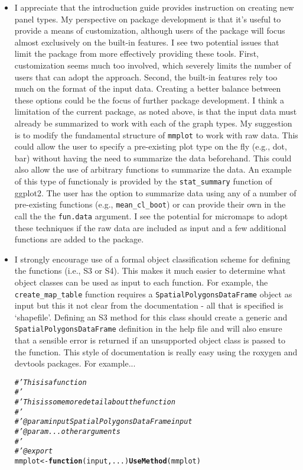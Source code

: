 \documentclass[letterpaper,12pt]{article}\usepackage[]{graphicx}\usepackage[]{color}
\makeatletter
\newcommand{\hlcom}[1]{\textcolor[rgb]{0.678,0.584,0.686}{\textit{#1}}}%
\newcommand{\hlstd}[1]{\textcolor[rgb]{0.345,0.345,0.345}{#1}}%
\newcommand{\hlkwa}[1]{\textcolor[rgb]{0.161,0.373,0.58}{\textbf{#1}}}%
\newcommand{\hlkwb}[1]{\textcolor[rgb]{0.69,0.353,0.396}{#1}}%
\newcommand{\hlkwc}[1]{\textcolor[rgb]{0.333,0.667,0.333}{#1}}%
\newcommand{\hlkwd}[1]{\textcolor[rgb]{0.737,0.353,0.396}{\textbf{#1}}}%
\newenvironment{kframe}{%
 \def\at@end@of@kframe{}%
 \ifinner\ifhmode%
  \def\at@end@of@kframe{\end{minipage}}%
  \begin{minipage}{\columnwidth}%
 \fi\fi%
 \def\FrameCommand##1{\hskip\@totalleftmargin \hskip-\fboxsep
 \colorbox{shadecolor}{##1}\hskip-\fboxsep
     \hskip-\linewidth \hskip-\@totalleftmargin \hskip\columnwidth}%
 \MakeFramed {\advance\hsize-\width
   \@totalleftmargin\z@ \linewidth\hsize
   \@setminipage}}%
 {\par\unskip\endMakeFramed%
 \at@end@of@kframe}
\makeatother
\begin{document}
\begin{itemize}
\item I appreciate that the introduction guide provides instruction on creating new panel types.  My perspective on package development is that it's useful to provide a means of customization, although users of the package will focus almost exclusively on the built-in features.  I see two potential issues that limit the package from more effectively providing these tools.  First, customization seems much too involved, which severely limits the number of users that can adopt the approach.  Second, the built-in features rely too much on the format of the input data.  Creating a better balance between these options could be the focus of further package development.  I think a limitation of the current package, as noted above, is that the input data must already be summarized to work with each of the graph types.  My suggestion is to modify the fundamental structure of \texttt{mmplot} to work with raw data.  This could allow the user to specify a pre-existing plot type on the fly (e.g., dot, bar) without having the need to summarize the data beforehand.  This could also allow the use of arbitrary functions to summarize the data.  An example of this type of functionaly is provided by the \texttt{stat\_summary} function of ggplot2.  The user has the option to summarize data using any of a number of pre-existing functions (e.g., \texttt{mean\_cl\_boot}) or can provide their own in the call the the \texttt{fun.data} argument.  I see the potential for micromaps to adopt these techniques if the raw data are included as input and a few additional functions are added to the package. 
\item I strongly encourage use of a formal object classification scheme for defining the functions (i.e., S3 or S4).  This makes it much easier to determine what object classes can be used as input to each function.  For example, the \texttt{create\_map\_table} function requires a \texttt{SpatialPolygonsDataFrame} object as input but this it not clear from the documentation - all that is specified is `shapefile'. Defining an S3 method for this class should create a generic and \texttt{SpatialPolygonsDataFrame} definition in the help file and will also ensure that a sensible error is returned if an unsupported object class is passed to the function.  This style of documentation is really easy using the roxygen and devtools packages.  
For example...
\begin{kframe}
\begin{alltt}
\hlcom{#' This is a function}
\hlcom{#'}
\hlcom{#' This is some more detail about the function}
\hlcom{#'}
\hlcom{#' @param input SpatialPolygonsDataFrame input}
\hlcom{#' @param ... other arguments}
\hlcom{#' }
\hlcom{#' @export}
\hlstd{mmplot} \hlkwb{<-} \hlkwa{function}\hlstd{(}\hlkwc{input}\hlstd{,} \hlkwc{...}\hlstd{)} \hlkwd{UseMethod}\hlstd{(mmplot)}


\end{alltt}
\end{kframe}
\end{itemize}
\end{document}
